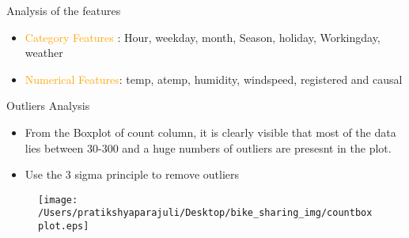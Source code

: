 \documentclass[
 size=14pt,
 paper=smartboard,  %
 mode=present, 		%
 display=slides, 	%
 style=tuliplab,  	%
 pauseslide,
 fleqn,leqno]{powerdot}
\begin{document}
\begin{slide}[toc=,bm=]{Analysis of the features}

  \begin{itemize}
  \item \textcolor{orange}{Category Features} : Hour, weekday, month, Season, holiday, Workingday, weather 
  \item \textcolor{orange}{Numerical Features}:  temp, atemp, humidity, windspeed, registered and causal 
 
  \end{itemize}
  \end{slide}

\begin{slide}[toc=,bm=]{ Outliers Analysis}

  \begin{itemize}
  \item From the Boxplot of count column, it is clearly visible that most of the data lies between 30-300 and a huge numbers of outliers are presesnt in the plot.
  \item Use the 3 sigma principle to remove outliers
  \end{itemize}
  \begin{figure}
    \centering
    \centerline{\texttt{[image: /Users/pratikshyaparajuli/Desktop/bike\_sharing\_img/countboxplot.eps]}}
  \end{figure}
  \end{slide}
  
\end{document}
